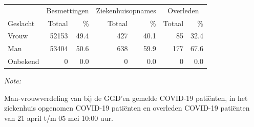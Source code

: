 \documentclass[
  english,
  man,floatsintext]{apa6}
\begin{document}
\begin{table}
\centering\begingroup\fontsize{11}{13}\selectfont

\begin{threeparttable}
\begin{tabular}{lrrrrrr}
\toprule
\multicolumn{1}{c}{ } & \multicolumn{2}{c}{Besmettingen} & \multicolumn{2}{c}{Ziekenhuisopnames} & \multicolumn{2}{c}{Overleden} \\
\cmidrule(l{3pt}r{3pt}){2-3} \cmidrule(l{3pt}r{3pt}){4-5} \cmidrule(l{3pt}r{3pt}){6-7}
Geslacht & Totaal & \% & Totaal & \% & Totaal & \%\\
\midrule
Vrouw & 52153 & 49.4 & 427 & 40.1 & 85 & 32.4\\
Man & 53404 & 50.6 & 638 & 59.9 & 177 & 67.6\\
Onbekend & 0 & 0.0 & 0 & 0.0 & 0 & 0.0\\
\bottomrule
\end{tabular}
\begin{tablenotes}
\item \textit{Note: } 
\item Man-vrouwverdeling van bij de GGD’en gemelde COVID-19 patiënten, in het ziekenhuis opgenomen COVID-19 patiënten en overleden COVID-19 patiënten van 21 april t/m 05 mei 10:00 uur.
\end{tablenotes}
\end{threeparttable}
\endgroup{}
\end{table}
\newpage
\end{document}
